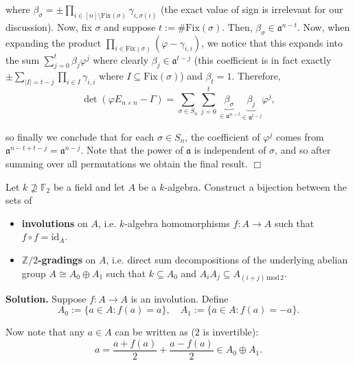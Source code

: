 \documentclass{template}
\newcommand{\qedwhite}{\hfill \ensuremath{\Box}}
\begin{document}
where $\beta_{\sigma} = \pm \prod_{i \in [n] \setminus \text{Fix}(\sigma)}
\gamma_{i,\sigma(i)}$ (the exact value of sign is irrelevant for our
discussion). Now, fix $\sigma$ and suppose $t := \#\text{Fix}(\sigma)$. Then,
$\beta_{\sigma} \in \mathfrak{a}^{n-t}$. Now, when expanding the product
$\prod_{i \in \text{Fix}(\sigma)} (\varphi - \gamma_{i,i})$, we notice that this
expands into the sum $\sum_{j=0}^t \beta_j\varphi^j$ where clearly $\beta_j \in
\mathfrak{a}^{t-j}$ (this coefficient is in fact exactly
$\pm\sum_{|I|=t-j}\prod_{i \in I}\gamma_{i,i}$ where $I \subseteq
\text{Fix}(\sigma)$) and $\beta_t=1$. Therefore,
\begin{equation*}
    \det(\varphi E_{n \times n} - \Gamma) = \sum_{\sigma \in S_n} \sum_{j=0}^t \underbrace{\beta_{\sigma}}_{\in \mathfrak{a}^{n-t}}\underbrace{\beta_j}_{\in \mathfrak{a}^{t-j}}\varphi^j,
\end{equation*}

so finally we conclude that for each $\sigma \in S_n$, the coefficient of
$\varphi^j$ comes from $\mathfrak{a}^{n-t+t-j} = \mathfrak{a}^{n-j}$. Note that
the power of $\mathfrak{a}$ is independent of $\sigma$, and so after summing
over all permutations we obtain the final result. \qedwhite

\begin{problem}[Exercise 2]
    Let $k \not\supseteq \mathbb{F}_2$ be a field and let $A$ be a $k$-algebra. 
    Construct a bijection between the sets of
    \begin{itemize}
        \item \textbf{involutions} on $A$, i.e. $k$-algebra homomorphisms $f: A \to A$
        such that $f \circ f = \text{id}_A$.
        \item \textbf{$\mathbb{Z}/2$-gradings} on $A$, i.e. direct sum 
        decompositions of the underlying abelian group $A \cong A_0 \oplus A_1$
        such that $k \subseteq A_0$ and $A_iA_j \subseteq A_{(i+j)\,\text{mod}\,2}$.
    \end{itemize}
\end{problem}

\textbf{Solution.} Suppose $f: A \to A$ is an involution. Define
\begin{equation*}
    A_0 := \{a \in A: f(a) = a\}, \quad A_1 := \{a \in A: f(a) = -a\}.
\end{equation*}

Now note that any $a \in A$ can be written as ($2$ is invertible):
\begin{equation*}
    a = \frac{a+f(a)}{2} + \frac{a-f(a)}{2} \in A_0 \oplus A_1.
\end{equation*}
\end{document}

